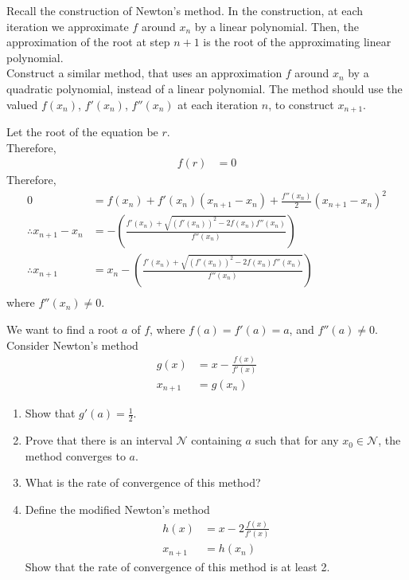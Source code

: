 \documentclass[fleqn, a4paper, 11pt, oneside]{amsart}
\theoremstyle{definition}
\theoremstyle{theorem}
\begin{document}
\begin{question}
	Recall the construction of Newton's method.
	In the construction, at each iteration we approximate $f$ around $x_n$ by a linear polynomial.
	Then, the approximation of the root at step $n + 1$ is the root of the approximating linear polynomial.\\
	Construct a similar method, that uses an approximation $f$ around $x_n$ by a quadratic polynomial, instead of a linear polynomial.
	The method should use the valued $f(x_n)$, $f'(x_n)$, $f''(x_n)$ at each iteration $n$, to construct $x_{n + 1}$.
\end{question}

\begin{solution}
	Let the root of the equation be $r$.\\
	Therefore,
	\begin{align*}
		f(r) & = 0
	\end{align*}
	Therefore,
	\begin{align*}
		0                          & = f(x_n) + f'(x_n) (x_{n + 1} - x_n) + \frac{f''(x_n)}{2} (x_{n + 1} - x_n)^2                        \\
		\therefore x_{n + 1} - x_n & = -\left( \frac{f'(x_n) + \sqrt{\left( f'(x_n) \right)^2 - 2 f(x_n) f''(x_n)}}{f''(x_n)} \right)     \\
		\therefore x_{n + 1}       & = x_n -\left( \frac{f'(x_n) + \sqrt{\left( f'(x_n) \right)^2 - 2 f(x_n) f''(x_n)}}{f''(x_n)} \right) \\
	\end{align*}
	where $f''(x_n) \neq 0$.\\
\end{solution}

\begin{question}
	We want to find a root $a$ of $f$, where $f(a) = f'(a) = a$, and $f''(a) \neq 0$.\\
	Consider Newton's method
	\begin{align*}
		g(x)      & = x - \frac{f(x)}{f'(x)} \\
		x_{n + 1} & = g(x_n)
	\end{align*}
	\begin{enumerate}
		\item
			Show that $g'(a) = \frac{1}{2}$.
		\item
			Prove that there is an interval $\mathcal{N}$ containing $a$ such that for any $x_0 \in \mathcal{N}$, the method converges to $a$.
		\item
			What is the rate of convergence of this method?
		\item
			Define the modified Newton's method
			\begin{align*}
				h(x)      & = x - 2 \frac{f(x)}{f'(x)} \\
				x_{n + 1} & = h(x_n)
			\end{align*}
			Show that the rate of convergence of this method is at least 2.
	\end{enumerate}
\end{question}
\end{document}
